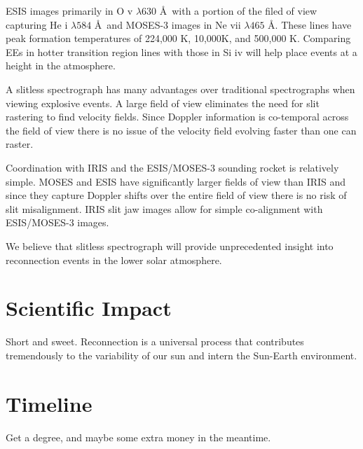 \documentclass[]{aastex6}
\begin{document}
	ESIS images primarily in O {\sc v} $\lambda 630$ \AA \ with a portion of the filed of view capturing He {\sc i} $\lambda 584$ \AA \ and MOSES-3 images in Ne {\sc vii} $\lambda 465$ \AA.  These lines have peak formation temperatures of 224,000 K, 10,000K, and 500,000 K. Comparing EEs in hotter transition region lines with those in Si {\sc iv} will help place events at a height in the atmosphere.
	
	A slitless spectrograph has many advantages over traditional spectrographs when viewing explosive events.  A large field of view eliminates the need for slit rastering to find velocity fields.  Since Doppler information is co-temporal across the field of view there is no issue of the velocity field evolving faster than one can raster. 
	
	Coordination with IRIS and the ESIS/MOSES-3 sounding rocket is relatively simple. MOSES and ESIS have significantly larger fields of view than IRIS and since they capture Doppler shifts over the entire field of view there is no risk of slit misalignment.  IRIS slit jaw images allow for simple co-alignment with ESIS/MOSES-3 images.
	
	We believe that slitless spectrograph will provide unprecedented insight into reconnection events in the lower solar atmosphere.


\section{Scientific Impact}
%
Short and sweet.  Reconnection is a universal process that contributes tremendously to the variability of our sun and intern the Sun-Earth environment.

 
\section{Timeline}
Get a  degree, and maybe some extra money in the meantime.





	
\end{document}
